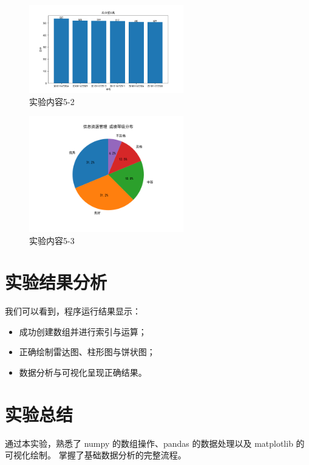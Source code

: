 \documentclass{article}
\begin{document}
\begin{figure}[H]
  \centering
  \includegraphics[width=0.6\textwidth]{Figure_1.png}
  \caption{实验内容5-2}
\end{figure}


\begin{figure}[H]
  \centering
  \includegraphics[width=0.6\textwidth]{Figure_2.png}
  \caption{实验内容5-3}
\end{figure}


\section{实验结果分析}

我们可以看到，程序运行结果显示：
\begin{itemize}
  \item 成功创建数组并进行索引与运算；
  \item 正确绘制雷达图、柱形图与饼状图；
  \item 数据分析与可视化呈现正确结果。
\end{itemize}

\section{实验总结}
通过本实验，熟悉了 numpy 的数组操作、pandas 的数据处理以及 matplotlib 的可视化绘制。  
掌握了基础数据分析的完整流程。
\end{document}
